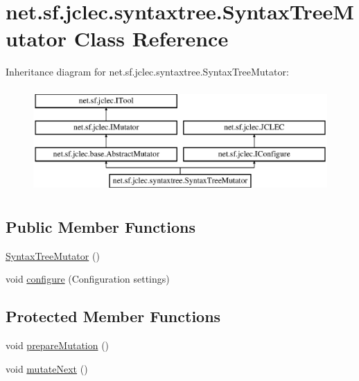\hypertarget{classnet_1_1sf_1_1jclec_1_1syntaxtree_1_1_syntax_tree_mutator}{\section{net.\-sf.\-jclec.\-syntaxtree.\-Syntax\-Tree\-Mutator Class Reference}
\label{classnet_1_1sf_1_1jclec_1_1syntaxtree_1_1_syntax_tree_mutator}
}
Inheritance diagram for net.\-sf.\-jclec.\-syntaxtree.\-Syntax\-Tree\-Mutator\-:\begin{figure}[H]
\begin{center}
\leavevmode
\includegraphics[height=4.000000cm]{classnet_1_1sf_1_1jclec_1_1syntaxtree_1_1_syntax_tree_mutator}
\end{center}
\end{figure}
\subsection*{Public Member Functions}
\begin{DoxyCompactItemize}
\item 
\hyperlink{classnet_1_1sf_1_1jclec_1_1syntaxtree_1_1_syntax_tree_mutator_a9e862d09ef2014b0b3916be1fa05a1cc}{Syntax\-Tree\-Mutator} ()
\item 
void \hyperlink{classnet_1_1sf_1_1jclec_1_1syntaxtree_1_1_syntax_tree_mutator_a1121fdb0ecbb9c448a18a8dea5f51566}{configure} (Configuration settings)
\end{DoxyCompactItemize}
\subsection*{Protected Member Functions}
\begin{DoxyCompactItemize}
\item 
void \hyperlink{classnet_1_1sf_1_1jclec_1_1syntaxtree_1_1_syntax_tree_mutator_a89e6a223695258e4f7e42edb54a4e077}{prepare\-Mutation} ()
\item 
void \hyperlink{classnet_1_1sf_1_1jclec_1_1syntaxtree_1_1_syntax_tree_mutator_a74e5f24fa1234791cb3e242c5426f9e8}{mutate\-Next} ()
\end{DoxyCompactItemize}
